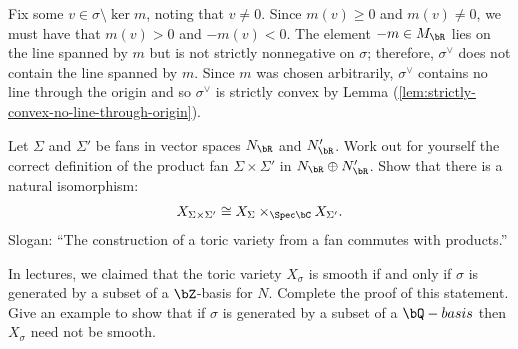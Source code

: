 \begin{homework}[e]
\begin{prf}
		Fix some $v \in \sigma \setminus \ker m$, noting that $v \neq 0$. Since $m(v) \geq 0$ and $m(v) \neq 0$, we must have that $m(v) > 0$ and $-m(v) < 0$. The element $-m\in M_\bR$  lies on the line spanned by $m$ but is not strictly nonnegative on $\sigma$; therefore, $\sigma ^{\vee}$ does not contain the line spanned by $m$. Since $m$ was chosen arbitrarily, $\sigma^{\vee}$ contains no line through the origin and so $\sigma^\vee$ is strictly convex by Lemma (\ref{lem:strictly-convex-no-line-through-origin}).
	\end{prf}
	\prob Let $\Sigma$ and $\Sigma'$ be fans in vector spaces $N_\bR$ and $N_\bR'$. Work out for yourself the correct definition of the product fan $\Sigma\times \Sigma'$ in $N_\bR \oplus N_\bR'$. Show that there is a natural isomorphism:
	\begin{align*}
		X_{\Sigma\times \Sigma'} \cong X_\Sigma \times_{\Spec \bC} X_{\Sigma'}.
	\end{align*}
	Slogan: ``The construction of a toric variety from a fan commutes with products.''

	\prob In lectures, we claimed that the toric variety $X_\sigma$ is smooth if and only if $\sigma$ is generated by a subset of a $\bZ$-basis for $N$. Complete the proof of this statement. Give an example to show that if $\sigma$ is generated by a subset of a $\bQ-basis$ then $X_\sigma$ need not be smooth.
	

\end{homework}
